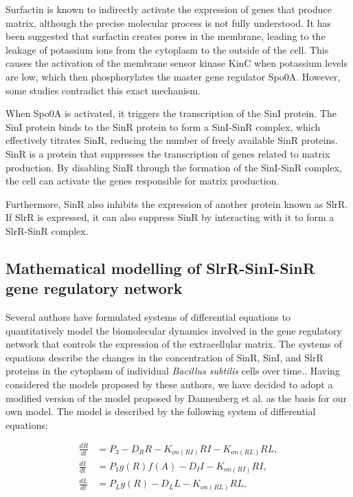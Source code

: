 Surfactin is known to indirectly activate the expression of genes that produce matrix, although the precise molecular process is not fully understood. It has been suggested that surfactin creates pores in the membrane, leading to the leakage of potassium ions from the cytoplasm to the outside of the cell. This causes the activation of the membrane sensor kinase KinC when potassium levels are low, which then phosphorylates the master gene regulator Spo0A.{\footnotesize\cite{Lpez20091}} However, some studies contradict this exact mechanism.{\footnotesize\cite{Devi2015}}

When Spo0A is activated, it triggers the transcription of the SinI protein. The SinI protein binds to the SinR protein to form a SinI-SinR complex, which effectively titrates SinR, reducing the number of freely available SinR proteins. SinR is a protein that suppresses the transcription of genes related to matrix production. By disabling SinR through the formation of the SinI-SinR complex, the cell can activate the genes responsible for matrix production.{\footnotesize\cite{Chai2011}}

Furthermore, SinR also inhibits the expression of another protein known as SlrR. If SlrR is expressed, it can also suppress SinR by interacting with it to form a SlrR-SinR complex.{\footnotesize\cite{Chai2011}}

\subsection{Mathematical modelling of SlrR-SinI-SinR gene regulatory network}\label{sec:litrev:theme2}
Several authors have formulated systems of differential equations to quantitatively model the biomolecular dynamics involved in the gene regulatory network that controls the expression of the extracellular matrix. The systems of equations describe the changes in the concentration of SinR, SinI, and SlrR proteins in the cytoplasm of individual \textit{Bacillus subtilis} cells over time.{\footnotesize\cite{simon}\cite{Voigt2005}\cite{Newman2013}\cite{Chen2023}\cite{Pedreira2021}\cite{Hallinan2010}}. Having considered the models proposed by these authors, we have decided to adopt a modified version of the model proposed by Dannenberg et al. {\footnotesize\cite{simon}} as the basis for our own model. The model is described by the following system of differential equations:

\begin{align}
\frac{dR}{dt} &= P_{3} - D_{R} R - K_{on(RI)} R I - K_{on(RL)}RL , \label{eq:1} \\
\frac{dI}{dt} &= P_{1}g(R)f(A) - D_{I} I - K_{on(RI)} R I , \label{eq:2} \\
\frac{dL}{dt} &= P_{L}g(R) - D_{L} L - K_{on(RL)} RL, \label{eq:3}
\end{align}

